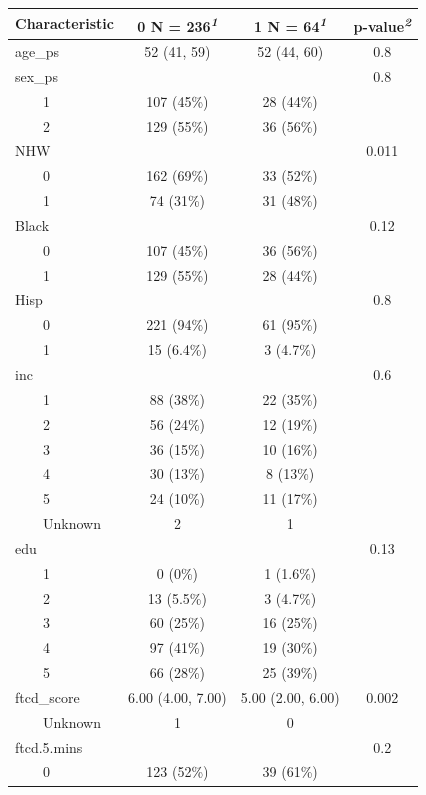 \documentclass[
  letterpaper,
  DIV=11,
  numbers=noendperiod]{scrartcl}
\begin{document}
\begingroup
\fontsize{12.0pt}{14.4pt}\selectfont
\setlength{\LTpost}{0mm}
\begin{longtable*}{lccc}
\toprule
\textbf{Characteristic} & \textbf{0}  N = 236\textsuperscript{\textit{1}} & \textbf{1}  N = 64\textsuperscript{\textit{1}} & \textbf{p-value}\textsuperscript{\textit{2}} \\ 
\midrule\addlinespace[2.5pt]
age\_ps & 52 (41, 59) & 52 (44, 60) & 0.8 \\ 
sex\_ps &  &  & 0.8 \\ 
    1 & 107 (45\%) & 28 (44\%) &  \\ 
    2 & 129 (55\%) & 36 (56\%) &  \\ 
NHW &  &  & 0.011 \\ 
    0 & 162 (69\%) & 33 (52\%) &  \\ 
    1 & 74 (31\%) & 31 (48\%) &  \\ 
Black &  &  & 0.12 \\ 
    0 & 107 (45\%) & 36 (56\%) &  \\ 
    1 & 129 (55\%) & 28 (44\%) &  \\ 
Hisp &  &  & 0.8 \\ 
    0 & 221 (94\%) & 61 (95\%) &  \\ 
    1 & 15 (6.4\%) & 3 (4.7\%) &  \\ 
inc &  &  & 0.6 \\ 
    1 & 88 (38\%) & 22 (35\%) &  \\ 
    2 & 56 (24\%) & 12 (19\%) &  \\ 
    3 & 36 (15\%) & 10 (16\%) &  \\ 
    4 & 30 (13\%) & 8 (13\%) &  \\ 
    5 & 24 (10\%) & 11 (17\%) &  \\ 
    Unknown & 2 & 1 &  \\ 
edu &  &  & 0.13 \\ 
    1 & 0 (0\%) & 1 (1.6\%) &  \\ 
    2 & 13 (5.5\%) & 3 (4.7\%) &  \\ 
    3 & 60 (25\%) & 16 (25\%) &  \\ 
    4 & 97 (41\%) & 19 (30\%) &  \\ 
    5 & 66 (28\%) & 25 (39\%) &  \\ 
ftcd\_score & 6.00 (4.00, 7.00) & 5.00 (2.00, 6.00) & 0.002 \\ 
    Unknown & 1 & 0 &  \\ 
ftcd.5.mins &  &  & 0.2 \\ 
    0 & 123 (52\%) & 39 (61\%) &  \\ 

\end{longtable*}
\end{document}
